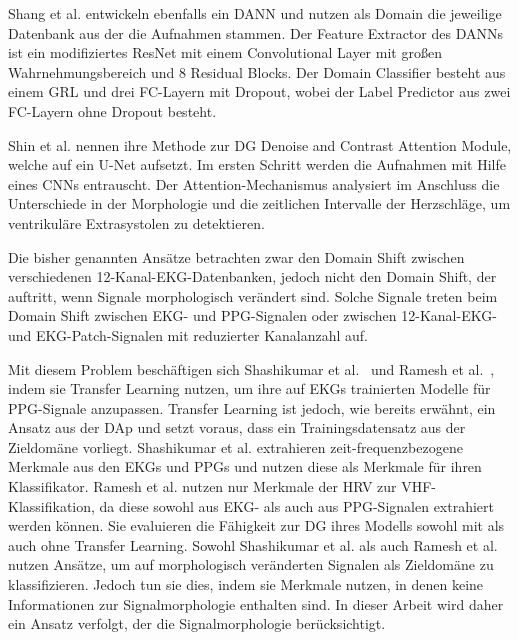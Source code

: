 Shang et al. \cite{shang_deep_2021} entwickeln ebenfalls ein \gls{DANN} und nutzen als Domain die jeweilige Datenbank aus der die Aufnahmen stammen. Der Feature Extractor des \gls{DANN}s ist ein modifiziertes ResNet mit einem Convolutional Layer mit großen Wahrnehmungsbereich und 8 Residual Blocks. Der Domain Classifier besteht aus einem \gls{GRL} und drei \gls{FC}-Layern mit Dropout, wobei der Label Predictor aus zwei \gls{FC}-Layern ohne Dropout besteht.

Shin et al. \cite{shin_enhancing_2023} nennen ihre Methode zur \gls{DG} \glqq Denoise and Contrast Attention Module\grqq{}, welche auf ein U-Net aufsetzt. Im ersten Schritt werden die Aufnahmen mit Hilfe eines \gls{CNN}s entrauscht. Der Attention-Mechanismus analysiert im Anschluss die Unterschiede in der Morphologie und die zeitlichen Intervalle der Herzschläge, um ventrikuläre Extrasystolen zu detektieren.

Die bisher genannten Ansätze betrachten zwar den Domain Shift zwischen verschiedenen 12-Kanal-\gls{EKG}-Datenbanken, jedoch nicht den Domain Shift, der auftritt, wenn Signale morphologisch verändert sind. Solche Signale treten beim Domain Shift zwischen \gls{EKG}- und \gls{PPG}-Signalen oder zwischen 12-Kanal-\gls{EKG}- und \gls{EKG}-Patch-Signalen mit reduzierter Kanalanzahl auf.

Mit diesem Problem beschäftigen sich Shashikumar et al.~\cite{shashikumar_detection_2018} und Ramesh et al.~\cite{ramesh_atrial_2021}, indem sie Transfer Learning nutzen, um ihre auf \gls{EKG}s trainierten Modelle für \gls{PPG}-Signale anzupassen. Transfer Learning ist jedoch, wie bereits erwähnt, ein Ansatz aus der \gls{DAp} und setzt voraus, dass ein Trainingsdatensatz aus der Zieldomäne vorliegt. Shashikumar et al. \cite{shashikumar_detection_2018} extrahieren zeit-frequenzbezogene Merkmale aus den \gls{EKG}s und \gls{PPG}s und nutzen diese als Merkmale für ihren Klassifikator. 
Ramesh et al. \cite{ramesh_atrial_2021} nutzen nur Merkmale der \gls{HRV} zur \gls{VHF}-Klassifikation, da diese sowohl aus \gls{EKG}- als auch aus \gls{PPG}-Signalen extrahiert werden können. Sie evaluieren die Fähigkeit zur \gls{DG} ihres Modells sowohl mit als auch ohne Transfer Learning. Sowohl Shashikumar et al. \cite{shashikumar_detection_2018} als auch Ramesh et al.\cite{ramesh_atrial_2021} nutzen Ansätze, um auf morphologisch veränderten Signalen als Zieldomäne zu klassifizieren. Jedoch tun sie dies, indem sie Merkmale nutzen, in denen keine Informationen zur Signalmorphologie enthalten sind. In dieser Arbeit wird daher ein Ansatz verfolgt, der die Signalmorphologie berücksichtigt.

